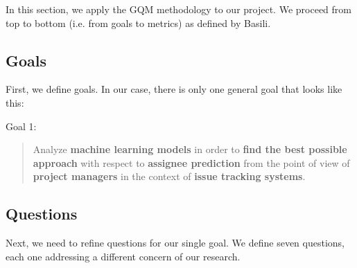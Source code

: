 In this section, we apply the GQM methodology to our project. We proceed from top to bottom (i.e. from goals to metrics) as defined by Basili.

\subsection{Goals}

First, we define goals. In our case, there is only one general goal that looks like this:

\begin{framed}
  \hypertarget{goal:1}{Goal 1:}
  \begin{quote}
    Analyze \textbf{machine learning models} in order to \textbf{find the best possible approach} with respect to \textbf{assignee prediction} from the point of view of \textbf{project managers} in the context of \textbf{issue tracking systems}.
  \end{quote}
\end{framed}

\subsection{Questions}

Next, we need to refine questions for our single goal. We define seven questions, each one addressing a different concern of our research.


